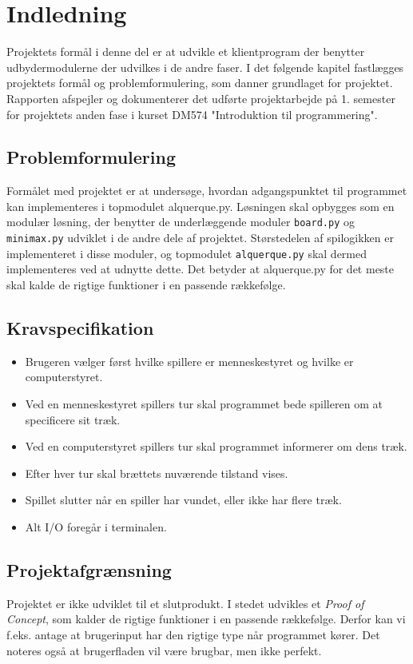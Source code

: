 \documentclass{article}
\begin{document}
\section{Indledning}
Projektets formål i denne del er at udvikle et klientprogram der benytter udbydermodulerne der udvilkes i de andre faser.
I det følgende kapitel fastlægges projektets formål og problemformulering,
som danner grundlaget for projektet.
Rapporten afspejler og dokumenterer det udførte projektarbejde på 1. semester for projektets anden fase i kurset DM574 "Introduktion til programmering".

\subsection{Problemformulering}
Formålet med projektet er at undersøge, hvordan adgangspunktet til
programmet kan implementeres i topmodulet alquerque.py.
Løsningen skal opbygges som en modulær løsning, der benytter de
underlæggende moduler \texttt{board.py} og \texttt{minimax.py} udviklet i de andre dele af projektet.
Størstedelen af spilogikken er implementeret i disse moduler, og
topmodulet \texttt{alquerque.py} skal dermed implementeres ved at udnytte dette.
Det betyder at alquerque.py for det meste skal kalde de rigtige funktioner
i en passende rækkefølge.

\subsection{Kravspecifikation}
\begin{itemize}
    \item Brugeren vælger først hvilke spillere er menneskestyret og hvilke er computerstyret.
    \item Ved en menneskestyret spillers tur skal programmet bede spilleren om at specificere sit træk.
    \item Ved en computerstyret spillers tur skal programmet informerer om dens træk.
    \item Efter hver tur skal brættets nuværende tilstand vises.
    \item Spillet slutter når en spiller har vundet, eller ikke har flere træk.  
    \item Alt I/O foregår i terminalen. 
\end{itemize}

\subsection{Projektafgrænsning}
Projektet er ikke udviklet til et slutprodukt. I stedet udvikles
et \textit{Proof of Concept}, som kalder de rigtige funktioner i en
passende rækkefølge. Derfor kan vi f.eks. antage at brugerinput
har den rigtige type når programmet kører. Det noteres også at brugerfladen vil være brugbar, men ikke perfekt.
\end{document}
